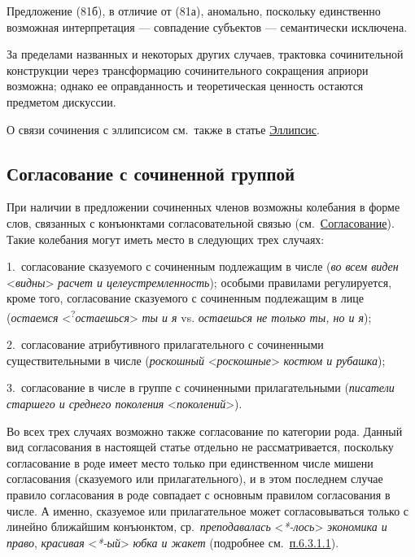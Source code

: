 Предложение (81б), в отличие от (81а), аномально, поскольку единственно
возможная интерпретация --- совпадение субъектов --- семантически
исключена.

За пределами названных и некоторых других случаев, трактовка
сочинительной конструкции через трансформацию сочинительного сокращения
априори возможна; однако ее оправданность и теоретическая ценность
остаются предметом дискуссии.

О связи сочинения с эллипсисом см.~также в статье \underline{Эллипсис}.

\subsection{Согласование с сочиненной
группой}\label{ux441ux43eux433ux43bux430ux441ux43eux432ux430ux43dux438ux435-ux441-ux441ux43eux447ux438ux43dux435ux43dux43dux43eux439-ux433ux440ux443ux43fux43fux43eux439}

При наличии в предложении сочиненных членов возможны колебания в форме
слов, связанных с конъюнктами согласовательной связью
(см.~\underline{Согласование}). Такие колебания могут иметь место в
следующих трех случаях:

1.~согласование сказуемого с сочиненным подлежащим в числе (\textit{во
всем виден} \textless{}\textit{видны}\textgreater{} \textit{расчет и
целеустремленность}); особыми правилами регулируется, кроме того,
согласование сказуемого с сочиненным подлежащим в лице (\textit{остаемся}
\textless{}\textsuperscript{?}\textit{остаешься}\textgreater{} \textit{ты и
я} vs. \textit{остаешься не только ты, но и я});

2.~согласование атрибутивного прилагательного с сочиненными
существительными в числе (\textit{роскошный}
\textless{}\textit{роскошные}\textgreater{} \textit{костюм и рубашка});

3.~согласование в числе в группе с сочиненными прилагательными
(\textit{писатели старшего и среднего поколения}
\textless{}\textit{поколений}\textgreater).

Во всех трех случаях возможно также согласование по категории рода.
Данный вид согласования в настоящей статье отдельно не рассматривается,
поскольку согласование в роде имеет место только при единственном числе
мишени согласования (сказуемого или прилагательного), и в этом последнем
случае правило согласования в роде совпадает с основным правилом
согласования в числе. А именно, сказуемое или прилагательное может
согласовываться только с линейно ближайшим конъюнктом,
ср.~\textit{преподавалась} \textless{}\textit{*-лось}\textgreater{}
\textit{экономика и право}, \textit{красивая}
\textless{}\textit{*-ый}\textgreater{} \textit{юбка и жакет} (подробнее
см.~\underline{п.6.3.1.1}).

